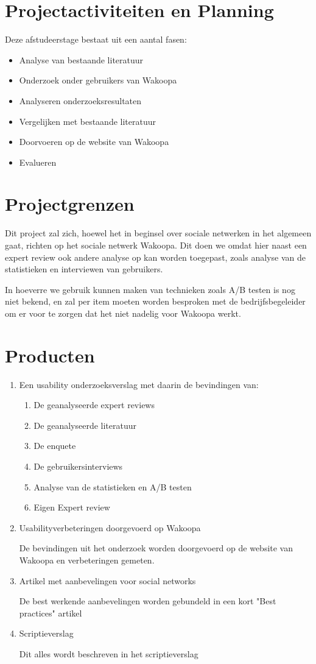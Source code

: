 \documentclass[a4paper, 10pt, pdftex]{article}
\begin{document}
\section{Projectactiviteiten en Planning}
Deze afstudeerstage bestaat uit een aantal fasen:

\begin{itemize}
\item
Analyse van bestaande literatuur
\item
Onderzoek onder gebruikers van Wakoopa
\item
Analyseren onderzoeksresultaten
\item
Vergelijken met bestaande literatuur
\item
Doorvoeren op de website van Wakoopa
\item
Evalueren
\end{itemize}

\section{Projectgrenzen}
Dit project zal zich, hoewel het in beginsel over sociale netwerken in het algemeen gaat, richten op het sociale netwerk Wakoopa. Dit doen we omdat hier naast een expert review ook andere analyse op kan worden toegepast, zoals analyse van de statistieken en interviewen van gebruikers.

In hoeverre we gebruik kunnen maken van technieken zoals A/B testen is nog niet bekend, en zal per item moeten worden besproken met de bedrijfsbegeleider om er voor te zorgen dat het niet nadelig voor Wakoopa werkt.

\section{Producten}
\begin{enumerate}
\item
Een usability onderzoeksverslag met daarin de bevindingen van:
  \begin{enumerate}
  \item
  De geanalyseerde expert reviews
  \item
  De geanalyseerde literatuur
  \item
  De enquete
  \item
  De gebruikersinterviews
  \item
  Analyse van de statistieken en A/B testen
  \item
  Eigen Expert review
  \end{enumerate}
\item
Usabilityverbeteringen doorgevoerd op Wakoopa

De bevindingen uit het onderzoek worden doorgevoerd op de website van Wakoopa en verbeteringen gemeten.
\item
Artikel met aanbevelingen voor social networks

De best werkende aanbevelingen worden gebundeld in een kort "Best practices" artikel
\item
Scriptieverslag

Dit alles wordt beschreven in het scriptieverslag
\end{enumerate}
\end{document}
